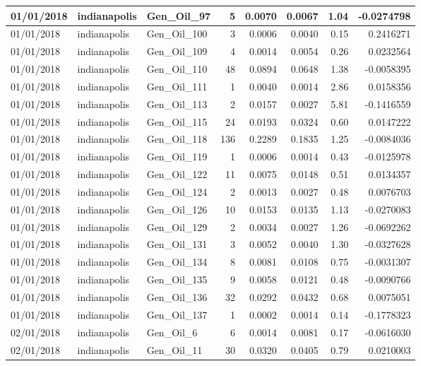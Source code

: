 \documentclass[
  letterpaper,
  DIV=11,
  numbers=noendperiod]{scrartcl}
\begin{document}
\begin{tabular}{l|l|l|r|r|r|r|r}
\hline
01/01/2018 & indianapolis & Gen\_Oil\_97 & 5 & 0.0070 & 0.0067 & 1.04 & -0.0274798\\
\hline
01/01/2018 & indianapolis & Gen\_Oil\_100 & 3 & 0.0006 & 0.0040 & 0.15 & 0.2416271\\
\hline
01/01/2018 & indianapolis & Gen\_Oil\_109 & 4 & 0.0014 & 0.0054 & 0.26 & 0.0232564\\
\hline
01/01/2018 & indianapolis & Gen\_Oil\_110 & 48 & 0.0894 & 0.0648 & 1.38 & -0.0058395\\
\hline
01/01/2018 & indianapolis & Gen\_Oil\_111 & 1 & 0.0040 & 0.0014 & 2.86 & 0.0158356\\
\hline
01/01/2018 & indianapolis & Gen\_Oil\_113 & 2 & 0.0157 & 0.0027 & 5.81 & -0.1416559\\
\hline
01/01/2018 & indianapolis & Gen\_Oil\_115 & 24 & 0.0193 & 0.0324 & 0.60 & 0.0147222\\
\hline
01/01/2018 & indianapolis & Gen\_Oil\_118 & 136 & 0.2289 & 0.1835 & 1.25 & -0.0084036\\
\hline
01/01/2018 & indianapolis & Gen\_Oil\_119 & 1 & 0.0006 & 0.0014 & 0.43 & -0.0125978\\
\hline
01/01/2018 & indianapolis & Gen\_Oil\_122 & 11 & 0.0075 & 0.0148 & 0.51 & 0.0134357\\
\hline
01/01/2018 & indianapolis & Gen\_Oil\_124 & 2 & 0.0013 & 0.0027 & 0.48 & 0.0076703\\
\hline
01/01/2018 & indianapolis & Gen\_Oil\_126 & 10 & 0.0153 & 0.0135 & 1.13 & -0.0270083\\
\hline
01/01/2018 & indianapolis & Gen\_Oil\_129 & 2 & 0.0034 & 0.0027 & 1.26 & -0.0692262\\
\hline
01/01/2018 & indianapolis & Gen\_Oil\_131 & 3 & 0.0052 & 0.0040 & 1.30 & -0.0327628\\
\hline
01/01/2018 & indianapolis & Gen\_Oil\_134 & 8 & 0.0081 & 0.0108 & 0.75 & -0.0031307\\
\hline
01/01/2018 & indianapolis & Gen\_Oil\_135 & 9 & 0.0058 & 0.0121 & 0.48 & -0.0090766\\
\hline
01/01/2018 & indianapolis & Gen\_Oil\_136 & 32 & 0.0292 & 0.0432 & 0.68 & 0.0075051\\
\hline
01/01/2018 & indianapolis & Gen\_Oil\_137 & 1 & 0.0002 & 0.0014 & 0.14 & -0.1778323\\
\hline
02/01/2018 & indianapolis & Gen\_Oil\_6 & 6 & 0.0014 & 0.0081 & 0.17 & -0.0616030\\
\hline
02/01/2018 & indianapolis & Gen\_Oil\_11 & 30 & 0.0320 & 0.0405 & 0.79 & 0.0210003\\

\end{tabular}
\end{document}
